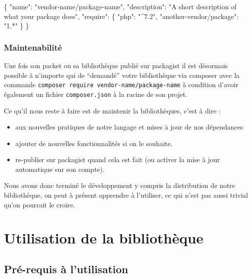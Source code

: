 \documentclass[11pt,a4paper,krantz2,11pt,oneside]{krantz}
\newenvironment{Shaded}{\begin{snugshade}}{\end{snugshade}}
\newcommand{\DataTypeTok}[1]{\textcolor[rgb]{0.27,0.27,0.27}{#1}}
\newcommand{\FunctionTok}[1]{\textcolor[rgb]{0,0,0}{#1}}
\newcommand{\StringTok}[1]{\textcolor[rgb]{0.5,0.5,0.5}{#1}}
\providecommand{\tightlist}{%
  \setlength{\itemsep}{0pt}\setlength{\parskip}{0pt}}
\begin{document}
\begin{Shaded}
\begin{Highlighting}[]
\FunctionTok{\{}
    \DataTypeTok{"name"}\FunctionTok{:} \StringTok{"vendor-name/package-name"}\FunctionTok{,}
    \DataTypeTok{"description"}\FunctionTok{:} \StringTok{"A short description of what your package does"}\FunctionTok{,}
    \DataTypeTok{"require"}\FunctionTok{:} \FunctionTok{\{}
        \DataTypeTok{"php"}\FunctionTok{:} \StringTok{"^7.2"}\FunctionTok{,}
        \DataTypeTok{"another-vendor/package"}\FunctionTok{:} \StringTok{"1.*"}
    \FunctionTok{\}}
\FunctionTok{\}}
\end{Highlighting}
\end{Shaded}

\hypertarget{maintenabilituxe9}{%
\subsection{Maintenabilité}\label{maintenabilituxe9}}

Une fois son packet ou sa bibliothèque publié sur packagist il est désormais possible à n'importe qui de ``demandé'' votre bibliothèque via composer avec la commande \texttt{composer\ require\ vendor-name/package-name} à condition d'avoir également un fichier \texttt{composer.json} à la racine de son projet.

Ce qu'il nous reste à faire est de maintenir la bibliothèques, c'est à dire :

\begin{itemize}
\tightlist
\item
  aux nouvelles pratiques de notre langage et mises à jour de nos dépendances
\item
  ajouter de nouvelles fonctionnalités si on le souhaite.
\item
  re-publier sur packagist quand cela est fait (ou activer la mise à jour automatique sur son compte).
\end{itemize}

Nous avons donc terminé le développement y compris la distribution de notre bibliothèque, on peut à présent apprendre à l'utiliser, ce qui n'est pas aussi trivial qu'on pourrait le croire.

\hypertarget{utils}{%
\chapter{Utilisation de la bibliothèque}\label{utils}}

\hypertarget{utils-pre-requis}{%
\section{Pré-requis à l'utilisation}\label{utils-pre-requis}}
\end{document}
